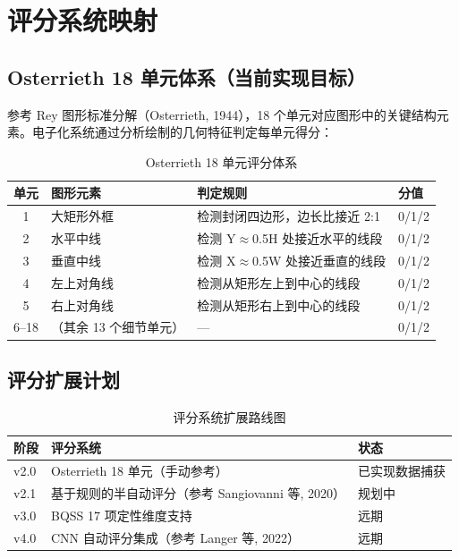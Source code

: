 \documentclass[12pt,a4paper]{ctexart}
\begin{document}
\section{评分系统映射}

\subsection{Osterrieth 18 单元体系（当前实现目标）}

参考 Rey 图形标准分解（Osterrieth, 1944），18 个单元对应图形中的关键结构元素。电子化系统通过分析绘制的几何特征判定每单元得分：

\begin{table}[h]
\centering
\begin{tabular}{cllp{4cm}}
\toprule
\textbf{单元} & \textbf{图形元素} & \textbf{判定规则} & \textbf{分值} \\
\midrule
1  & 大矩形外框   & 检测封闭四边形，边长比接近 2:1  & 0/1/2 \\
2  & 水平中线     & 检测 Y$\approx$0.5H 处接近水平的线段 & 0/1/2 \\
3  & 垂直中线     & 检测 X$\approx$0.5W 处接近垂直的线段 & 0/1/2 \\
4  & 左上对角线   & 检测从矩形左上到中心的线段  & 0/1/2 \\
5  & 右上对角线   & 检测从矩形右上到中心的线段  & 0/1/2 \\
6--18 & （其余 13 个细节单元） & — & 0/1/2 \\
\bottomrule
\end{tabular}
\caption{Osterrieth 18 单元评分体系}
\end{table}

\subsection{评分扩展计划}

\begin{table}[h]
\centering
\begin{tabular}{lll}
\toprule
\textbf{阶段} & \textbf{评分系统} & \textbf{状态} \\
\midrule
v2.0 & Osterrieth 18 单元（手动参考） & 已实现数据捕获 \\
v2.1 & 基于规则的半自动评分（参考 Sangiovanni 等, 2020） & 规划中 \\
v3.0 & BQSS 17 项定性维度支持 & 远期 \\
v4.0 & CNN 自动评分集成（参考 Langer 等, 2022） & 远期 \\
\bottomrule
\end{tabular}
\caption{评分系统扩展路线图}
\end{table}
\end{document}
